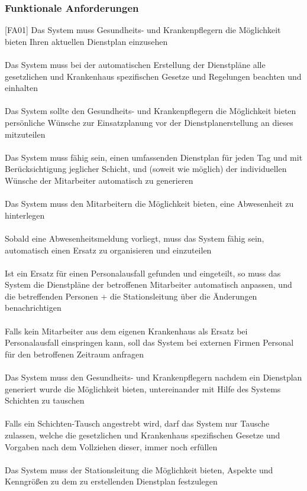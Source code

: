 \documentclass[11pt,
paper=a4,
bibtotocnumbered,	  %
liststotocnumbered,  %
DIV=calc,		  %
tablecaptionabove,	  %
headinclude,
]{article}
\begin{document}
\subsubsection{Funktionale Anforderungen}
[FA01] Das System muss Gesundheits- und Krankenpflegern die Möglichkeit bieten Ihren aktuellen Dienstplan einzusehen\\\\
[FA02] Das System muss bei der automatischen Erstellung der Dienstpläne alle gesetzlichen und Krankenhaus spezifischen Gesetze und Regelungen beachten und einhalten\\\\
[FA03] Das System sollte den Gesundheits- und Krankenpflegern die Möglichkeit bieten persönliche Wünsche zur Einsatzplanung vor der Dienstplanerstellung an dieses mitzuteilen\\\\
[FA04] Das System muss fähig sein, einen umfassenden Dienstplan für jeden Tag und mit Berücksichtigung jeglicher Schicht, und (soweit wie möglich) der individuellen Wünsche der Mitarbeiter automatisch zu generieren\\\\
[FA05] Das System muss den Mitarbeitern die Möglichkeit bieten, eine Abwesenheit zu hinterlegen\\\\
[FA06] Sobald eine Abwesenheitsmeldung vorliegt, muss das System fähig sein, automatisch einen Ersatz zu organisieren und einzuteilen\\\\
[FA07] Ist ein Ersatz für einen Personalausfall gefunden und eingeteilt, so muss das System die Dienstpläne der betroffenen Mitarbeiter automatisch anpassen, und die betreffenden Personen + die Stationsleitung über die Änderungen benachrichtigen\\\\
[FA08] Falls kein Mitarbeiter aus dem eigenen Krankenhaus als Ersatz bei Personalausfall einspringen kann, soll das System bei externen Firmen Personal für den betroffenen Zeitraum anfragen\\\\
[FA09] Das System muss den Gesundheits- und Krankenpflegern nachdem ein Dienstplan generiert wurde die Möglichkeit bieten, untereinander mit Hilfe des Systems Schichten zu tauschen\\\\
[FA10] Falls ein Schichten-Tausch angestrebt wird, darf das System nur Tausche zulassen, welche die gesetzlichen und Krankenhaus spezifischen Gesetze und Vorgaben nach dem Vollziehen dieser, immer noch erfüllen\\\\
[FA11] Das System muss der Stationsleitung die Möglichkeit bieten, Aspekte und Kenngrößen zu dem zu erstellenden Dienstplan festzulegen\\\\
\end{document}
